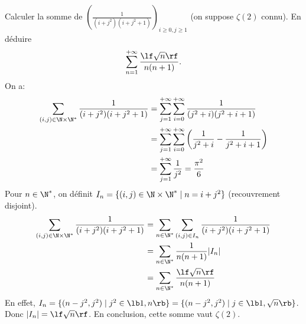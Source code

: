 \documentclass[11pt]{article}
\begin{document}
\begin{exercice}{}{}
    Calculer la somme de \Large$\left( \frac{1}{(i+j^2)(i+j^2+1)} \right)_{i\geq 0,j\geq1}$ \normalsize (on suppose $\zeta(2)$ connu). En déduire
    \begin{equation*}
        \sum_{n=1}^{+\infty}\frac{\lf \sqrt{n} \rf}{n(n+1)}.
    \end{equation*}
    \tcblower
    On a:
    \begin{align*}
        \sum_{(i,j)\in\N\times\N^*}\frac{1}{(i+j^2)(i+j^2+1)}&=\sum_{j=1}^{+\infty}\sum_{i=0}^{+\infty}\frac{1}{(j^2+i)(j^2+i+1)}\\
        &=\sum_{j=1}^{+\infty}\sum_{i=0}^{+\infty}\left( \frac{1}{j^2+i}-\frac{1}{j^2+i+1} \right)\\
        &=\sum_{j=1}^{+\infty}\frac{1}{j^2}=\frac{\pi^2}{6}
    \end{align*}
    Pour $n\in\N^*$, on définit $I_n=\{(i,j)\in\N\times\N^*\mid n=i+j^2\}$ (recouvrement disjoint).
    \begin{align*}
        \sum_{(i,j)\in\N\times\N^*}\frac{1}{(i+j^2)(i+j^2+1)}&=\sum_{n\in\N^*}\sum_{(i,j)\in I_n}\frac{1}{(i+j^2)(i+j^2+1)}\\
        &=\sum_{n\in\N^*}\frac{1}{n(n+1)}|I_n|\\
        &=\sum_{n\in\N^*}\frac{\lf \sqrt{n} \rf}{n(n+1)}
    \end{align*}
    En effet, $I_n=\{(n-j^2,j^2)\mid j^2\in\lb1,n\rb\}=\{(n-j^2,j^2)\mid j\in\lb1,\sqrt{n}\rb\}$. Donc $|I_n|=\lf\sqrt{n}\rf$.\n
    En conclusion, cette somme vaut $\zeta(2)$.
\end{exercice}
\end{document}
